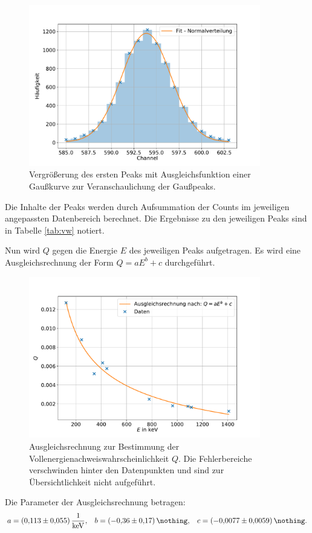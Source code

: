 \begin{figure}[h!]
  \centering
  \includegraphics[width=0.9\textwidth]{content/images/einzelnergaussfit_0.pdf}
  \caption{Vergrößerung des ersten Peaks mit Ausgleichsfunktion einer Gaußkurve zur Veranschaulichung der Gaußpeaks.}
  \label{fig:einzelnergaussfit_0}
\end{figure}
Die Inhalte der Peaks werden durch Aufsummation der Counts im jeweiligen angepassten Datenbereich berechnet.
Die Ergebnisse zu den jeweiligen Peaks sind in Tabelle \ref{tab:vw} notiert.

Nun wird $Q$ gegen die Energie $E$ des jeweiligen Peaks aufgetragen.
Es wird eine Ausgleichsrechnung der Form $Q=a E^{b} + c$ durchgeführt.
\begin{figure}[h!]
  \centering
  \includegraphics[width=0.9\textwidth]{content/images/vollenergienachweiswahrscheinlichkeit.pdf}
  \caption{Ausgleichsrechnung zur Bestimmung der Vollenergienachweiswahrscheinlichkeit $Q$.
  Die Fehlerbereiche verschwinden hinter den Datenpunkten und sind zur Übersichtlichkeit nicht aufgeführt.}
  \label{fig:vw}
\end{figure}
Die Parameter der Ausgleichsrechnung betragen:
\begin{align*}
	a = \SI{0.113 (55)}{\frac{1}{\kilo \electronvolt}}, && b = \SI{-0.36 (17)}{\nothing}, && c = \SI{-0.0077 (59)}{\nothing}.
\end{align*}

